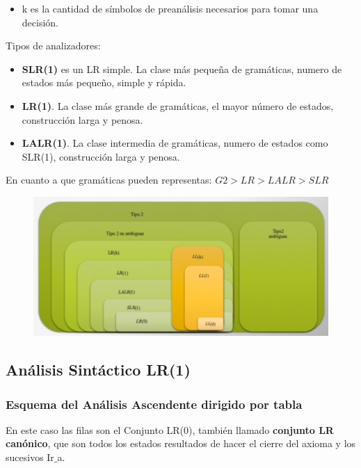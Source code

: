 \documentclass[12pt]{report} %
\begin{document}
\begin{itemize}
  \item k es la cantidad de símbolos de preanálisis necesarios para tomar una decisión.
\end{itemize}

Tipos de analizadores:
\begin{itemize}
  \item \textbf{SLR(1)} es un LR simple. La clase más pequeña de gramáticas, numero de estados más pequeño, simple y rápida.
  \item \textbf{LR(1)}. La clase más grande de gramáticas, el mayor número de estados, construcción larga y penosa.
  \item \textbf{LALR(1)}. La clase intermedia de gramáticas, numero de estados como SLR(1), construcción larga y penosa.
\end{itemize}
En cuanto a que gramáticas pueden representas: $G2>LR>LALR>SLR$

\begin{figure}[H]
	{\includegraphics[scale=.57]{2021-04-13 15_35_24-ASintactico.pdf - Foxit Reader.png}}
\end{figure}

\subsection{Análisis Sintáctico LR(1)}

\subsubsection{Esquema del Análisis Ascendente dirigido por tabla}
En este caso las filas son el Conjunto LR(0), también llamado \textbf{conjunto LR canónico}, que son todos los estados resultados de hacer el cierre del axioma y los sucesivos Ir$\_$a.
\end{document}
